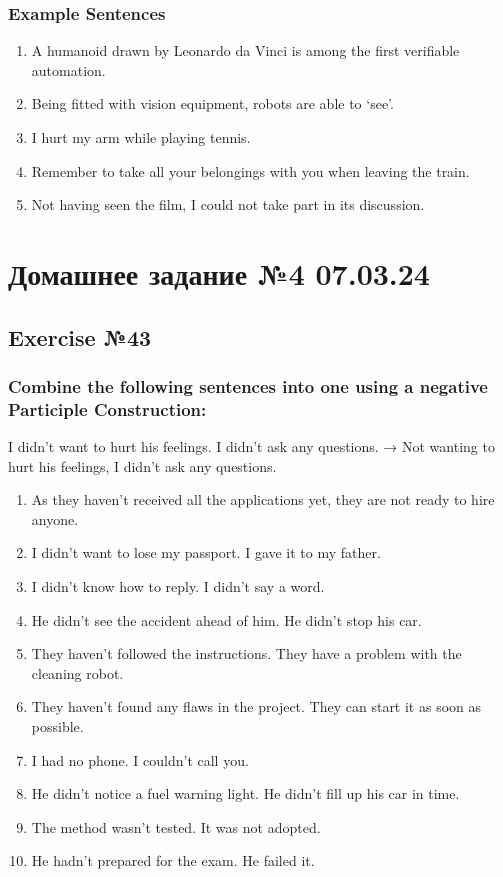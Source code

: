 \subsection*{Example Sentences}
\begin{enumerate}
      \item A humanoid drawn by Leonardo da Vinci is among the first verifiable
            automation.
      \item Being fitted with vision equipment, robots are able to ‘see’.
      \item I hurt my arm while playing tennis.
      \item Remember to take all your belongings with you when leaving the train.
      \item Not having seen the film, I could not take part in its discussion.
\end{enumerate}

\chapter{Домашнее задание №4 07.03.24}

\section{Exercise №43}
\subsection*{Combine the following sentences into one using a negative Participle Construction:}
 I didn’t want to hurt his feelings. I didn’t ask any questions. → Not wanting to hurt his
feelings, I didn’t ask any questions.

\begin{enumerate}
      \item As they haven't received all the applications yet, they are not ready to hire anyone.
      \item I didn't want to lose my passport. I gave it to my father.
      \item I didn't know how to reply. I didn't say a word.
      \item He didn't see the accident ahead of him. He didn't stop his car.
      \item They haven't followed the instructions. They have a problem with the cleaning robot.
      \item They haven't found any flaws in the project. They can start it as soon as possible.
      \item I had no phone. I couldn't call you.
      \item He didn't notice a fuel warning light. He didn't fill up his car in time.
      \item The method wasn't tested. It was not adopted.
      \item He hadn't prepared for the exam. He failed it.
\end{enumerate}

